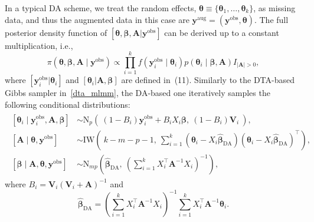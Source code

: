 \documentclass[12pt]{article}
\begin{document}
\begin{appendix}
In a typical DA scheme, we treat the random effects, $\boldsymbol{\theta}\equiv\{\boldsymbol{\theta}_1, \ldots, \boldsymbol{\theta}_k\}$, as missing data, and thus the augmented data in this case are $\boldsymbol{y}^{\textrm{aug}}=(\boldsymbol{y}^{\textrm{obs}}, \boldsymbol{\theta})$. The full posterior density function of $[\boldsymbol{\theta},  \boldsymbol{\beta}, \boldsymbol{A}\vert \boldsymbol{y}^{\textrm{obs}}]$ can be derived up to a constant multiplication, i.e.,
$$
\pi(\boldsymbol{\theta},  \boldsymbol{\beta}, \boldsymbol{A}\mid \boldsymbol{y}^{\textrm{obs}})\propto \prod_{i=1}^kf(\boldsymbol{y}^{\textrm{obs}}_i\mid \boldsymbol{\theta}_i)p(\boldsymbol{\theta}_i\mid  \boldsymbol{\beta}, \boldsymbol{A})I_{\vert \boldsymbol{A}\vert>0},
$$
where $[\boldsymbol{y}^{\textrm{obs}}_i\vert \boldsymbol{\theta}_i]$ and $[\boldsymbol{\theta}_i\vert \boldsymbol{A}, \boldsymbol{\beta}]$ are defined in~(11). Similarly to the DTA-based Gibbs sampler in~\eqref{dta_mlmm},  the DA-based one iteratively samples the following conditional distributions:
\begin{align}
\begin{aligned}\label{da_mlmm}
[\boldsymbol{\theta}_i\mid \boldsymbol{y}^{\textrm{obs}}_i, \boldsymbol{A}, \boldsymbol{\beta}] &\sim \textrm{N}_p\!\left(~(1-B_i) \boldsymbol{y}^{\textrm{obs}}_i+B_iX_i\boldsymbol{\beta},~ (1-B_i)\boldsymbol{V}\!_i~\right),\\
[\boldsymbol{A}\mid \boldsymbol{\theta}, \boldsymbol{y}^{\textrm{obs}}] & \sim \textrm{IW}\!\left(~k-m-p-1,~ \sum_{i=1}^k(\boldsymbol{\theta}_i-X_i\hat{\boldsymbol{\beta}}_{\textrm{DA}})(\boldsymbol{\theta}_i-X_i\hat{\boldsymbol{\beta}}_{\textrm{DA}})^\top\right), \\
[\boldsymbol{\beta}\mid \boldsymbol{A}, \boldsymbol{\theta}, \boldsymbol{y}^{\textrm{obs}}] &\sim \textrm{N}_{mp}\!\left(\hat{\boldsymbol{\beta}}_{\textrm{DA}},~ \left(\sum_{i=1}^kX^\top_i \boldsymbol{A}^{-1}X_i\right)^{-1}\right),
\end{aligned}
\end{align}
where $B_i=\boldsymbol{V}\!_i(\boldsymbol{V}\!_i+\boldsymbol{A})^{-1}$ and
$$
\hat{\boldsymbol{\beta}}_{\textrm{DA}}= \left(\sum_{i=1}^kX^\top_i \boldsymbol{A}^{-1}X_i\right)^{-1}\sum_{i=1}^kX^\top_i \boldsymbol{A}^{-1}\boldsymbol{\theta}_i.
$$



\end{appendix}
\end{document}
